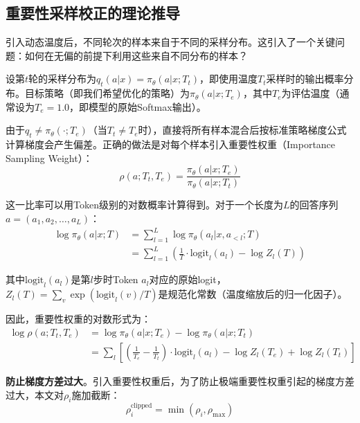 \subsection{重要性采样校正的理论推导}
\label{subsec:importance_sampling_correction}

引入动态温度后，不同轮次的样本来自于不同的采样分布。这引入了一个关键问题：如何在无偏的前提下利用这些来自不同分布的样本？

设第$t$轮的采样分布为$q_t(a|x) = \pi_\theta(a|x; T_t)$，即使用温度$T_t$采样时的输出概率分布。目标策略（即我们希望优化的策略）为$\pi_\theta(a|x; T_e)$，其中$T_e$为评估温度（通常设为$T_e = 1.0$，即模型的原始Softmax输出）。

由于$q_t \neq \pi_\theta(\cdot; T_e)$（当$T_t \neq T_e$时），直接将所有样本混合后按标准策略梯度公式计算梯度会产生偏差。正确的做法是对每个样本引入重要性权重（Importance Sampling Weight）：
\begin{equation}
\rho(a; T_t, T_e) = \frac{\pi_\theta(a|x; T_e)}{\pi_\theta(a|x; T_t)}
\label{eq:importance_weight}
\end{equation}

这一比率可以用Token级别的对数概率计算得到。对于一个长度为$L$的回答序列$a = (a_1, a_2, \ldots, a_L)$：
\begin{align}
\log \pi_\theta(a|x; T) &= \sum_{l=1}^L \log \pi_\theta(a_l | x, a_{<l}; T) \\
&= \sum_{l=1}^L \left( \frac{1}{T} \cdot \text{logit}_l(a_l) - \log Z_l(T) \right)
\label{eq:log_probability}
\end{align}

其中$\text{logit}_l(a_l)$是第$l$步时Token $a_l$对应的原始logit，$Z_l(T) = \sum_v \exp(\text{logit}_l(v)/T)$是规范化常数（温度缩放后的归一化因子）。

因此，重要性权重的对数形式为：
\begin{align}
\log \rho(a; T_t, T_e) &= \log \pi_\theta(a|x; T_e) - \log \pi_\theta(a|x; T_t) \\
&= \sum_l \left[ \left(\frac{1}{T_e} - \frac{1}{T_t}\right) \cdot \text{logit}_l(a_l) - \log Z_l(T_e) + \log Z_l(T_t) \right]
\label{eq:log_importance_weight}
\end{align}

\textbf{防止梯度方差过大}。引入重要性权重后，为了防止极端重要性权重引起的梯度方差过大，本文对$\rho_i$施加截断：
\begin{equation}
\rho_i^{\text{clipped}} = \min(\rho_i, \rho_{\max})
\label{eq:importance_weight_clipping}
\end{equation}

